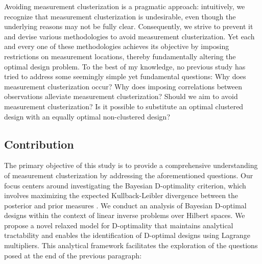Avoiding measurement clusterization is a pragmatic approach:
intuitively, we recognize that measurement clusterization is
undesirable, even though the underlying reasons may not be fully
clear. Consequently, we strive to prevent it and devise various
methodologies to avoid measurement clusterization. Yet each and every
one of these methodologies achieves its objective by imposing
restrictions on measurement locations, thereby fundamentally altering
the optimal design problem. To the best of my knowledge, no previous
study has tried to address some seemingly simple yet fundamental
questions:
%
Why does measurement clusterization occur?
%
Why does imposing correlations between observations alleviate
measurement clusterization?
%
Should we aim to avoid measurement clusterization?
%
Is it possible to substitute an optimal clustered design with an
equally optimal non-clustered design?


\subsection{Contribution}
The primary objective of this study is to provide a comprehensive
understanding of measurement clusterization by addressing the
aforementioned questions. Our focus centers around investigating the
Bayesian D-optimality criterion, which involves maximizing the
expected Kullback-Leibler divergence between the posterior and prior
measures \cite{CoverThomas91, Chaloner1995}. We conduct an analysis of
Bayesian D-optimal designs within the context of linear inverse
problems over Hilbert spaces. We propose a novel relaxed model for
D-optimality that maintains analytical tractability and enables the
identification of D-optimal designs using Lagrange multipliers. This
analytical framework facilitates the exploration of the questions
posed at the end of the previous paragraph:


